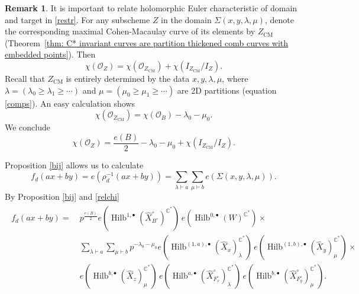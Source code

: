 \documentclass{amsart}
\theoremstyle{definition}
\newtheorem{remark}[theorem]{Remark}
\newcommand{\CC} {\mathbb{C}}          %
\renewcommand{\O}{\mathcal{O}}
\newcommand{\Hilb}{\operatorname{Hilb}}
\newcommand{\CM}{\operatorname{CM}}
\newcommand{\Xhat}{\widehat{X}}
\begin{document}
\begin{remark}
It is important to relate holomorphic Euler characteristic of domain
and target in \eqref{restr}. For any subscheme $Z$ in the domain
$\Sigma(x,y,\lambda,\mu)$, denote the corresponding maximal
Cohen-Macaulay curve of its elements by $Z_{\CM}$ (Theorem~\ref{thm:
C* invariant curves are partition thickened comb curves with embedded
points}). Then
$$
\chi(\O_Z) = \chi(\O_{Z_{\CM}}) + \chi(I_{Z_{\CM}} / I_{Z}).
$$ 
Recall that $Z_{\CM}$ is entirely determined by the data $x,y, \lambda, \mu$, where $\lambda = (\lambda_0 \geq \lambda_1 \geq \cdots)$ and $\mu = (\mu_0 \geq \mu_1 \geq \cdots)$ are 2D partitions (equation \eqref{comps}). An easy calculation shows 
$$
\chi(\O_{Z_{\CM}}) = \chi(\O_B) - \lambda_0 - \mu_0.
$$
We conclude
\begin{equation} \label{relchi}
\chi(\O_Z) = \frac{e(B)}{2} - \lambda_0 - \mu_0 + \chi(I_{Z_{\CM}} / I_{Z}).
\end{equation}
\end{remark}

Proposition \ref{bij} allows us to calculate 
$$
f_d(ax+by) = e(\rho_{d}^{-1}(ax+by)) = \sum_{\lambda \vdash a} \sum_{\mu \vdash b} e(\Sigma(x,y,\lambda,\mu)).
$$
By Proposition \ref{bij} and \eqref{relchi} 
\begin{align}
\begin{split} \label{fdintermediate}
f_d(ax+by) = \ &p^{\frac{e(B)}{2}} e(\Hilb^{1,\bullet}(\Xhat ^{\circ}_{B^{\circ}})^{\CC^*}) \, e(\Hilb^{0,\bullet}(W)^{\CC^*}) \times \\
&\sum_{\lambda \vdash a} \sum_{\mu \vdash b} p^{- \lambda_0 - \mu_0 } e(\Hilb^{(1,a),\bullet}(\Xhat _{x})_{\lambda}^{\CC^*}) \, e(\Hilb^{(1,b),\bullet}(\Xhat _{y})_{\mu}^{\CC^*}) \times \\
&e(\Hilb^{b,\bullet}(\Xhat _{z})_{\mu}^{\CC^*}) \, e(\Hilb^{a,\bullet}(\Xhat ^{\circ}_{F_{x}^{\circ}})_{\lambda}^{\CC^*}) \, e(\Hilb^{b,\bullet}(\Xhat ^{\circ}_{F_{y}^{\circ}})_{\mu}^{\CC^*}).
\end{split}
\end{align}
\end{document}
